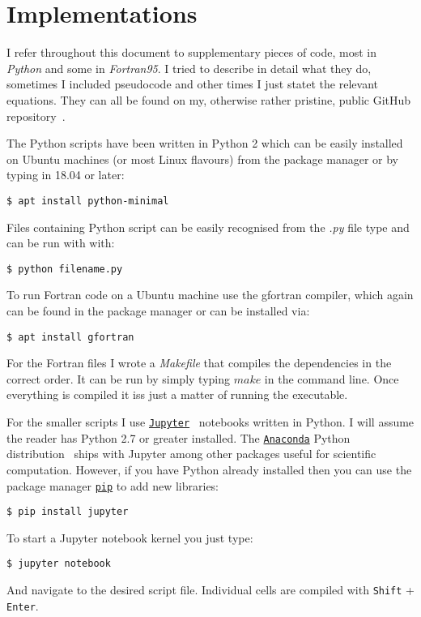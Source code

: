 
\chapter{Implementations}

I refer throughout this document to supplementary pieces of code, most in \emph{Python} and some in \emph{Fortran95}. I tried to describe in detail what they do, sometimes I included pseudocode and other times I just statet the relevant equations. They can all be found on my, otherwise rather pristine, public GitHub repository~\cite{myGitHub}. 

The Python scripts have been written in Python 2 which can be easily installed on Ubuntu machines (or most Linux flavours) from the package manager or by typing in 18.04 or later:
\begin{verbatim}
$ apt install python-minimal
\end{verbatim}

Files containing Python script can be easily recognised from the \textit{.py} file type and can be run with with:
\begin{verbatim}
$ python filename.py
\end{verbatim}

To run Fortran code on a Ubuntu machine  use the gfortran compiler, which again can be found in the package manager or can be installed via:
\begin{verbatim}
$ apt install gfortran
\end{verbatim}

For the Fortran files I wrote a \textit{Makefile} that compiles the dependencies in the correct order. It can be run by simply typing $make$ in the command line. Once everything is compiled it iss just a matter of running the executable. 

For the smaller scripts I use \href{http://jupyter.org}{\texttt{Jupyter}}~\cite{Jupyter} notebooks written in Python. I will assume the reader has Python 2.7 or greater installed. The \href{https://anaconda.org/}{\texttt{Anaconda}} Python distribution~\cite{Conda} ships with Jupyter among other packages useful for scientific computation. However, if you have Python already installed then you can use the package manager \href{https://pypi.org/project/pip/}{\texttt{pip}} to add new libraries:
\begin{verbatim}
$ pip install jupyter
\end{verbatim}
To start a Jupyter notebook kernel you just type:
\begin{verbatim}
$ jupyter notebook
\end{verbatim}
And navigate to the desired script file. Individual cells are compiled with \texttt{Shift} + \texttt{Enter}.

